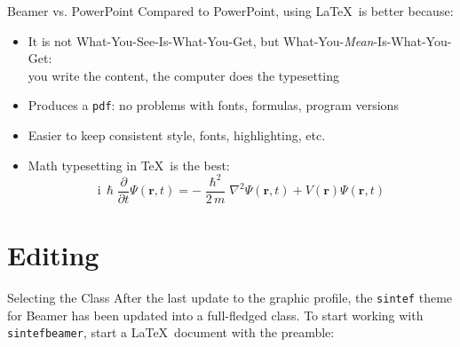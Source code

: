 \documentclass[10pt,aspectratio=169]{beamer}
\begin{document}
\begin{frame}{Beamer vs. PowerPoint}
Compared to PowerPoint, using \LaTeX\ is better because:
\begin{itemize}
\item It is not What-You-See-Is-What-You-Get, but
What-You-\emph{Mean}-Is-What-You-Get:\\
you write the content, the computer does the typesetting
\item Produces a \texttt{pdf}: no problems with fonts, formulas,
      program versions
\item Easier to keep consistent style, fonts, highlighting, etc.
\item Math typesetting in \TeX\ is the best:
\begin{equation*}
\mathrm{i}\,\hslash\frac{\partial}{\partial t} \Psi(\mathbf{r},t) =
-\frac{\hslash^2}{2\,m}\nabla^2\Psi(\mathbf{r},t)
+ V(\mathbf{r})\Psi(\mathbf{r},t)
\end{equation*}

\end{itemize}
\end{frame}

\section{Editing}

\begin{frame}[fragile]{Selecting the Class}
After the last update to the graphic profile, the \texttt{sintef} theme for
Beamer has been updated into a full-fledged class.
To start working with \texttt{sintefbeamer}, start a \LaTeX\ document with the
preamble:
\end{frame}
\end{document}
